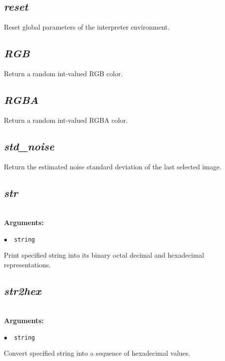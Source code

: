 \documentclass[a4paper,10.5pt,twoside]{book}
\def\comma{\discretionary{,}{}{,}}
\newcommand{\Cb}[1]{\textcolor{cb}{#1}}
\begin{document}
\subsection{\emph{reset} }\vspace*{-0.7em}
Reset global parameters of the interpreter environment.


\subsection{\emph{RGB} }\vspace*{-0.7em}
Return a random int-valued RGB color.


\subsection{\emph{RGBA} }\vspace*{-0.7em}
Return a random int-valued RGBA color.


\subsection{\emph{std\_noise} }\vspace*{-0.7em}
Return the estimated noise standard deviation of the last selected image.


\subsection{\emph{str} }\vspace*{-0.7em}
~\\\textbf{\Cb{Arguments: }}\begin{flushleft}
{\small \Cb{\hspace*{0.5cm}$\bullet$~~\texttt{string}}}\end{flushleft}
Print specified string into its binary{\comma} octal{\comma} decimal and hexadecimal representations.


\subsection{\emph{str2hex} }\vspace*{-0.7em}
~\\\textbf{\Cb{Arguments: }}\begin{flushleft}
{\small \Cb{\hspace*{0.5cm}$\bullet$~~\texttt{string}}}\end{flushleft}
Convert specified string into a sequence of hexadecimal values.
\end{document}
